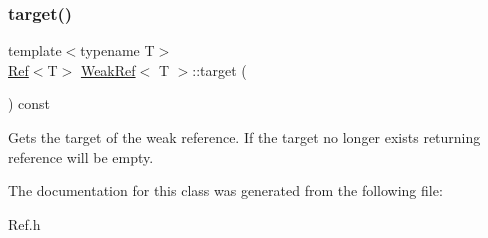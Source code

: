 \subsubsection{\texorpdfstring{target()}{target()}}
{\footnotesize\ttfamily template$<$typename T$>$ \\
\mbox{\hyperlink{class_ref}{Ref}}$<$T$>$ \mbox{\hyperlink{class_weak_ref}{Weak\+Ref}}$<$ T $>$\+::target (\begin{DoxyParamCaption}{ }\end{DoxyParamCaption}) const\hspace{0.3cm}{\ttfamily [inline]}}



Gets the target of the weak reference. If the target no longer exists returning reference will be empty. 



The documentation for this class was generated from the following file\+:\begin{DoxyCompactItemize}
\item 
Ref.\+h\end{DoxyCompactItemize}
